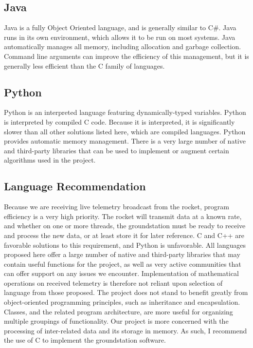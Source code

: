 \documentclass[onecolumn, draftclsnofoot,10pt, compsoc]{IEEEtran}
\begin{document}
		\subsection{Java}
			\noindent
			Java is a fully Object Oriented language, and is generally similar to C\#.
			Java runs in its own environment, which allows it to be run on most systems.
			Java automatically manages all memory, including allocation and garbage collection.
			Command line arguments can improve the efficiency of this management, but it is generally less efficient than the C family of languages.
			
		\subsection{Python}
			\noindent
			Python is an interpreted language featuring dynamically-typed variables.
			Python is interpreted by compiled C code.
			Because it is interpreted, it is significantly slower than all other solutions listed here, which are compiled languages.
			Python provides automatic memory management.
			There is a very large number\cite{Python-libraries} of native and third-party libraries that can be used to implement or augment certain algorithms used in the project.
		
		\subsection{Language Recommendation}
			\noindent
			Because we are receiving live telemetry broadcast from the rocket, program efficiency is a very high priority.
			The rocket will transmit data at a known rate, and whether on one or more threads, the groundstation must be ready to receive and process the new data, or at least store it for later reference.
			C and C++ are favorable solutions to this requirement, and Python is unfavorable.
			All languages proposed here offer a large number of native and third-party libraries that may contain useful functions for the project, as well as very active communities that can offer support on any issues we encounter.
			Implementation of mathematical operations on received telemetry is therefore not reliant upon selection of language from those proposed.
			The project does not stand to benefit greatly from object-oriented programming principles, such as inheritance and encapsulation.
			Classes, and the related program architecture, are more useful for organizing multiple groupings of functionality.
			Our project is more concerned with the processing of inter-related data and its storage in memory.
			As such, I recommend the use of C to implement the groundstation software.
			
\end{document}

